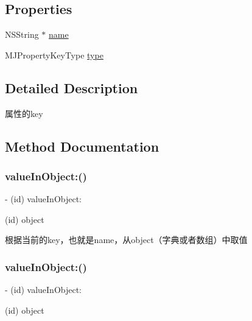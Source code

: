 \subsection*{Properties}
\begin{DoxyCompactItemize}
\item 
N\+S\+String $\ast$ \mbox{\hyperlink{interface_m_j_property_key_a63ca0c12601b49ec60958588c0685774}{name}}
\item 
M\+J\+Property\+Key\+Type \mbox{\hyperlink{interface_m_j_property_key_acb6050c50cd0811ec029ea8450222700}{type}}
\end{DoxyCompactItemize}


\subsection{Detailed Description}
属性的key 

\subsection{Method Documentation}
\mbox{\label{interface_m_j_property_key_a7febfc473835f5d17bf904f7c2b05c1c}} 
\subsubsection{\texorpdfstring{value\+In\+Object\+:()}{valueInObject:()}\hspace{0.1cm}{\footnotesize\ttfamily [1/3]}}
{\footnotesize\ttfamily -\/ (id) value\+In\+Object\+: \begin{DoxyParamCaption}\item[{(id)}]{object }\end{DoxyParamCaption}}

根据当前的key，也就是name，从object（字典或者数组）中取值 \mbox{\label{interface_m_j_property_key_a7febfc473835f5d17bf904f7c2b05c1c}} 
\subsubsection{\texorpdfstring{value\+In\+Object\+:()}{valueInObject:()}\hspace{0.1cm}{\footnotesize\ttfamily [2/3]}}
{\footnotesize\ttfamily -\/ (id) value\+In\+Object\+: \begin{DoxyParamCaption}\item[{(id)}]{object }\end{DoxyParamCaption}}

